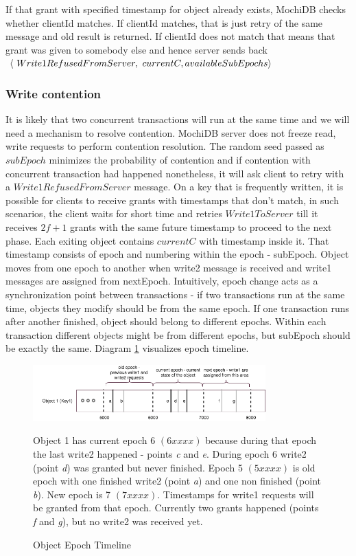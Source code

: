 \documentclass[letterpaper,twocolumn,10pt]{article}
\begin{document}
If that grant with specified timestamp for object already exists, MochiDB checks whether clientId matches. If clientId matches, that is just retry of the same message and old result is returned. If clientId does not match that means that grant was given to somebody else and hence server sends back
$\langle\ Write1RefusedFromServer,\ currentC,\\ availableSubEpochs\rangle$


\subsubsection{Write contention} \label{write_contension}
It is likely that two concurrent transactions will run at the same time and we will need a mechanism to resolve contention. MochiDB server does not freeze read, write requests to perform contention resolution. The random seed passed as $subEpoch$ minimizes the probability of contention and if contention with concurrent transaction had happened nonetheless, it will ask client to retry with a $Write1RefusedFromServer$ message. On a key that is frequently written, it is possible for clients to receive grants with timestamps that don't match, in such scenarios, the client waits for short time and retries $Write1ToServer$ till it receives $2f+1$ grants with the same future timestamp to proceed to the next phase.
Each exiting object contains $currentC$ with timestamp inside it. That timestamp consists of epoch and numbering within the epoch - subEpoch. Object moves from one epoch to another when write2 message is received and write1 messages are assigned from nextEpoch. Intuitively, epoch change acts as a synchronization point between transactions - if two transactions run at the same time, objects they modify should be from the same epoch. If one transaction runs after another finished, object should belong to different epochs. Within each transaction different objects might be from different epochs, but subEpoch should be exactly the same. Diagram \ref{fig:epochs_view} visualizes epoch timeline. 

\begin{figure}
\includegraphics[width=0.8\textwidth]{Epochs.png}
\label{fig:epochs_view}
\caption{Object Epoch Timeline}
\small Object 1 has current epoch 6 $\left(6xxxx\right)$ because during that epoch the last write2 happened - points \textit{c} and \textit{e}. During epoch 6 write2 (point \textit{d}) was granted but never finished. Epoch 5 $\left(5xxxx\right)$ is old epoch with one finished write2 (point \textit{a}) and one non finished (point \textit{b}). New epoch is 7 $\left(7xxxx\right)$. Timestamps for write1 requests will be granted from that epoch. Currently two grants happened (points \textit{f} and \textit{g}), but no write2 was received yet.
\centering
\end{figure}
\end{document}
